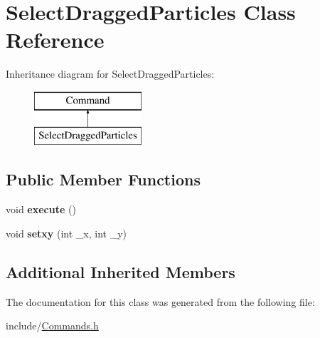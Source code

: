 \hypertarget{classSelectDraggedParticles}{\section{Select\-Dragged\-Particles Class Reference}
\label{classSelectDraggedParticles}
}
Inheritance diagram for Select\-Dragged\-Particles\-:\begin{figure}[H]
\begin{center}
\leavevmode
\includegraphics[height=2.000000cm]{classSelectDraggedParticles}
\end{center}
\end{figure}
\subsection*{Public Member Functions}
\begin{DoxyCompactItemize}
\item 
\hypertarget{classSelectDraggedParticles_a048c90d378429a3b19aa1c4696a31b0f}{void {\bfseries execute} ()}\label{classSelectDraggedParticles_a048c90d378429a3b19aa1c4696a31b0f}

\item 
\hypertarget{classSelectDraggedParticles_abece54f7450b0f91e7f0e4c1fead266b}{void {\bfseries setxy} (int \-\_\-x, int \-\_\-y)}\label{classSelectDraggedParticles_abece54f7450b0f91e7f0e4c1fead266b}

\end{DoxyCompactItemize}
\subsection*{Additional Inherited Members}


The documentation for this class was generated from the following file\-:\begin{DoxyCompactItemize}
\item 
include/\hyperlink{Commands_8h}{Commands.\-h}\end{DoxyCompactItemize}
